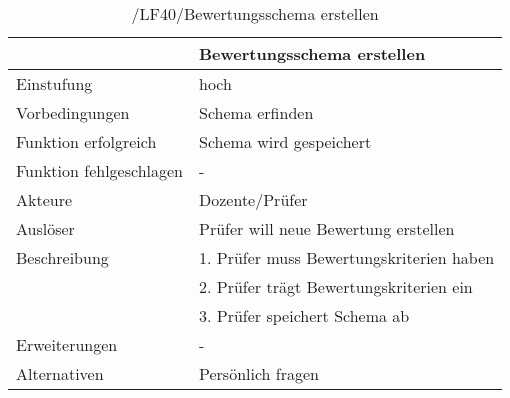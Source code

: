 	\begin{table}[H]
		\centering
		\caption{/LF40/Bewertungsschema erstellen}
		\begin{tabularx}{\textwidth}{l|X}
			\toprule
			                        &               Bewertungsschema erstellen \\ \midrule
			             Einstufung &                                     hoch \\
			         Vorbedingungen &                          Schema erfinden \\
			   Funktion erfolgreich &                  Schema wird gespeichert \\
			Funktion fehlgeschlagen &                                        - \\
			                Akteure &                          Dozente/Prüfer \\
			               Auslöser &     Prüfer will neue Bewertung erstellen \\
			           Beschreibung & 1. Prüfer muss Bewertungskriterien haben \\
			                        &  2. Prüfer trägt Bewertungskriterien ein \\
			                        &            3. Prüfer speichert Schema ab \\
			          Erweiterungen &                                        - \\
			           Alternativen &                        Persönlich fragen \\ \bottomrule
		\end{tabularx}%
		\label{tab:LF40createBewSchem}%
	\end{table}%
	
